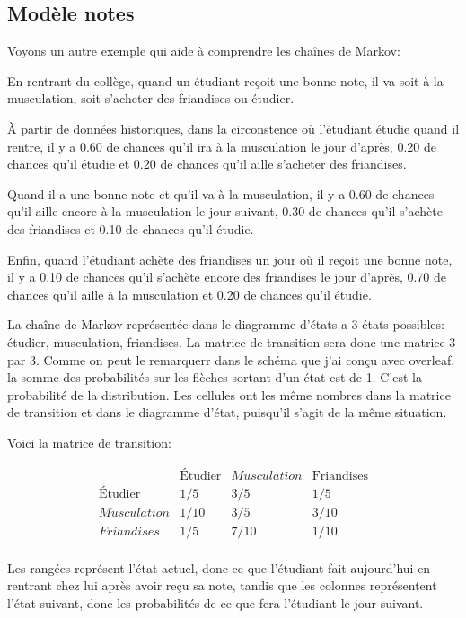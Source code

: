 \documentclass[10pt]{article}
\begin{document}
\subsection{Modèle notes}

Voyons un autre exemple qui aide à comprendre les chaînes de Markov:

En rentrant du collège, quand un étudiant reçoit une bonne note, il va soit à la musculation, soit s'acheter des friandises ou étudier.

À partir de données historiques, dans la circonstence où l'étudiant étudie quand il rentre, il y a 0.60 de chances qu'il ira à la musculation le jour d'après, 0.20 de chances qu'il étudie et 0.20 de chances qu'il aille s'acheter des friandises. 

Quand il a une bonne note et qu'il va à la musculation, il y a 0.60 de chances qu'il aille encore à la musculation le jour suivant, 0.30 de chances qu'il s'achète des friandises et 0.10 de chances qu'il étudie.

Enfin, quand l'étudiant achète des friandises un jour où il reçoit une bonne note, il y a 0.10 de chances qu'il s'achète encore des friandises le jour d'après, 0.70 de chances qu'il aille à la musculation et 0.20 de chances qu'il étudie.

La chaîne de Markov représentée dans le diagramme d'états a 3 états possibles: étudier, musculation, friandises. La matrice de transition sera donc une matrice 3 par 3. Comme on peut le remarquerr dans le schéma que j'ai conçu avec overleaf, la somme des probabilités sur les flèches sortant d'un état est de 1. C'est la probabilité de la distribution. Les cellules ont les même nombres dans la matrice de transition et dans le diagramme d'état, puisqu'il s'agit de la même situation.


Voici la matrice de transition:


\[
        \begin{array}{c|ccc}
	& \text{Étudier} & Musculation & \text{Friandises}\\
	\hline
	\text{Étudier} & 1/5 & 3/5 & 1/5\\
	Musculation & 1/10 & 3/5 & 3/10\\
	Friandises & 1/5 & 7/10 & 1/10\\
	\end{array}
\]



Les rangées représent l'état actuel, donc ce que l'étudiant fait aujourd'hui en rentrant chez lui après avoir reçu sa note, tandis que les colonnes représentent l'état suivant, donc les probabilités de ce que fera l'étudiant le jour suivant.

\nocite{*}


\end{document}
